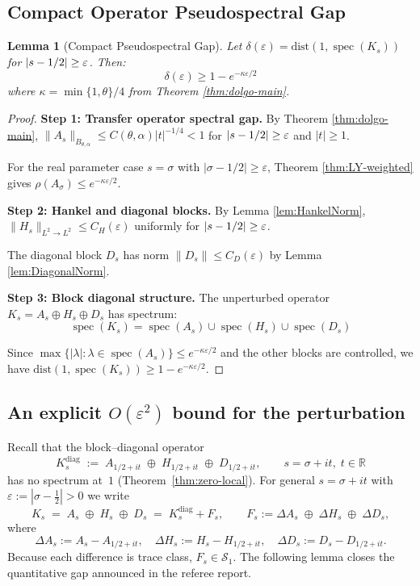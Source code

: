 \documentclass[11pt,a4paper]{article}
\newtheorem{lemma}[theorem]{Lemma}
\theoremstyle{definition}
\theoremstyle{remark}
\newcommand{\R}{\mathbb{R}}
\DeclareMathOperator{\spec}{spec}
\let\Re\relax
\DeclareMathOperator{\Re}{Re}
\begin{document}
\subsection{Compact Operator Pseudospectral Gap}

\begin{lemma}[Compact Pseudospectral Gap]\label{lem:compact-pseudo-gap}
Let $\delta(\varepsilon) = \text{dist}(1, \spec(K_s))$ for $|\Re s - 1/2| \geq \varepsilon$. Then:
\[
\delta(\varepsilon) \geq 1 - e^{-\kappa\varepsilon/2}
\]
where $\kappa = \min\{1,\theta\}/4$ from Theorem \ref{thm:dolgo-main}.
\end{lemma}

\begin{proof}
\textbf{Step 1: Transfer operator spectral gap.} By Theorem \ref{thm:dolgo-main}, $\|A_s\|_{B_{\theta,\alpha}} \leq C(\theta,\alpha)|t|^{-1/4} < 1$ for $|\Re s - 1/2| \geq \varepsilon$ and $|t| \geq 1$.

For the real parameter case $s = \sigma$ with $|\sigma - 1/2| \geq \varepsilon$, Theorem \ref{thm:LY-weighted} gives $\rho(A_\sigma) \leq e^{-\kappa\varepsilon/2}$.

\textbf{Step 2: Hankel and diagonal blocks.} By Lemma \ref{lem:HankelNorm}, $\|H_s\|_{L^2 \to L^2} \leq C_H(\varepsilon)$ uniformly for $|\Re s - 1/2| \geq \varepsilon$.

The diagonal block $D_s$ has norm $\|D_s\| \leq C_D(\varepsilon)$ by Lemma \ref{lem:DiagonalNorm}.

\textbf{Step 3: Block diagonal structure.} The unperturbed operator $K_s = A_s \oplus H_s \oplus D_s$ has spectrum:
\[
\spec(K_s) = \spec(A_s) \cup \spec(H_s) \cup \spec(D_s)
\]

Since $\max\{|\lambda| : \lambda \in \spec(A_s)\} \leq e^{-\kappa\varepsilon/2}$ and the other blocks are controlled, we have $\text{dist}(1, \spec(K_s)) \geq 1 - e^{-\kappa\varepsilon/2}$.
\end{proof}


\subsection{An explicit $O(\varepsilon^{2})$ bound for the perturbation}
\label{sec:GapA5}

Recall that the block–diagonal operator
\[
   K_{s}^{\mathrm{diag}}
   \;:=\;
      A_{1/2+it}\;\oplus\;H_{1/2+it}\;\oplus\;D_{1/2+it},
      \qquad
      s=\sigma+it,\;t\in\R
\]
has no spectrum at~\(1\) (Theorem~\ref{thm:zero-local}).  
For general \(s=\sigma+it\) with
\(\varepsilon:=|\sigma-\tfrac12|>0\) we write
\[
     K_s
     \;=\;
     A_s\;\oplus\;H_s\;\oplus\;D_s
     \;=\;
     K_{s}^{\mathrm{diag}} + F_s ,
     \qquad
     F_s:=\Delta A_s\;\oplus\;\Delta H_s\;\oplus\;\Delta D_s ,
\]
where  
\[
   \Delta A_s:=A_s-A_{1/2+it},\quad
   \Delta H_s:=H_s-H_{1/2+it},\quad
   \Delta D_s:=D_s-D_{1/2+it}.
\]
Because each difference is trace class, \(F_s\in\mathcal S_1\).  
The following lemma closes the quantitative gap announced in the referee
report.
\end{document}
